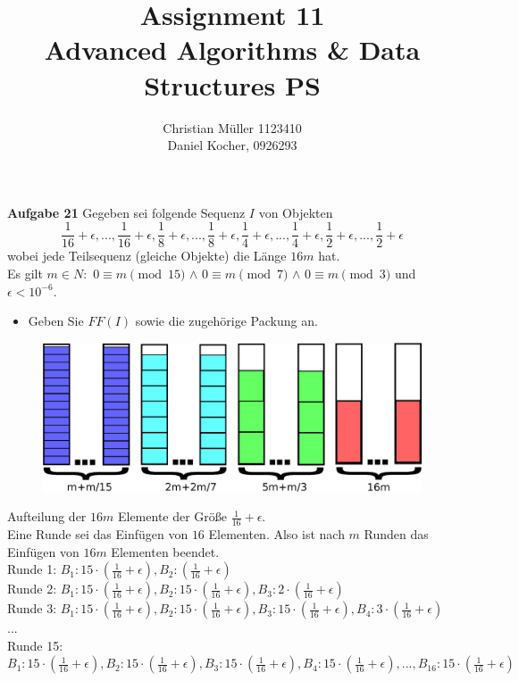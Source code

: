 \documentclass{article}
\begin{document}
\title{Assignment 11 \\ Advanced Algorithms \& Data Structures PS}%
\author{Christian Müller 1123410 \\ Daniel Kocher, 0926293}%
\maketitle

{\bfseries Aufgabe 21}%
Gegeben sei folgende Sequenz $I$ von Objekten
\begin{equation}
\frac{1}{16}+\epsilon,...,\frac{1}{16}+\epsilon,\frac{1}{8}+\epsilon,...,\frac{1}{8}+\epsilon,\frac{1}{4}+\epsilon,...,\frac{1}{4}+\epsilon,\frac{1}{2}+\epsilon,...,\frac{1}{2}+\epsilon
\end{equation}
wobei jede Teilsequenz (gleiche Objekte) die Länge $16m $ hat.\\ Es gilt $m\in N: $ $0 \equiv m \pmod{15}$ $\wedge$ $0 \equiv m \pmod{7}$ $\wedge$ $0 \equiv m \pmod{3}$ und $\epsilon < 10^{-6}$.
\begin{itemize}
	\item Geben Sie $FF(I)$ sowie die zugehörige Packung an.
\end{itemize}
\begin{figure}[H]
\begin{center}
	\includegraphics[scale=.5]{drawing}
\end{center}
\end{figure}
Aufteilung der $16m$ Elemente der Größe  $\frac{1}{16}+\epsilon$. \\
Eine Runde sei das Einfügen von $16$ Elementen. Also ist nach $m$ Runden das Einfügen von $16m$ Elementen beendet.\\

Runde 1: $B_{1}: 15\cdot(\frac{1}{16}+\epsilon), B_{2}:(\frac{1}{16}+\epsilon) $\\
Runde 2: $B_{1}: 15\cdot(\frac{1}{16}+\epsilon), B_{2}:15\cdot(\frac{1}{16}+\epsilon), B_{3}: 2\cdot(\frac{1}{16}+\epsilon) $\\
Runde 3: $B_{1}: 15\cdot(\frac{1}{16}+\epsilon), B_{2}:15\cdot(\frac{1}{16}+\epsilon), B_{3}: 15\cdot(\frac{1}{16}+\epsilon),B_{4}: 3\cdot(\frac{1}{16}+\epsilon)  $\\
...\\
Runde 15: $B_{1}: 15\cdot(\frac{1}{16}+\epsilon), B_{2}:15\cdot(\frac{1}{16}+\epsilon), B_{3}: 15\cdot(\frac{1}{16}+\epsilon),B_{4}: 15\cdot(\frac{1}{16}+\epsilon), ...,B_{16}: 15\cdot(\frac{1}{16}+\epsilon) $
\end{document}
